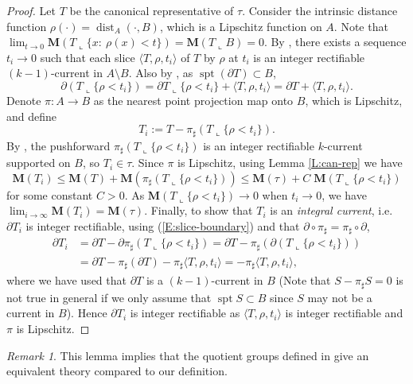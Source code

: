 \documentclass[10pt]{amsart}
\theoremstyle{definition}
\theoremstyle{remark}
\newtheorem{remark}[theorem]{Remark}
\numberwithin{equation}{section}
\newcommand{\lan}{\langle}
\newcommand{\ran}{\rangle}
\newcommand{\lc}{\llcorner}
\newcommand{\M}{\mathbf{M}}
\newcommand{\spt}{\operatorname{spt}}
\newcommand{\dist}{\operatorname{dist}}
\begin{document}
\begin{proof}
Let $T$ be the canonical representative of $\tau$. Consider the intrinsic distance function $\rho(\cdot) =\dist_A(\cdot, B)$, which is a Lipschitz function on $A$. Note that $\lim_{t\rightarrow 0}\M(T\lc \{x:\ \rho(x)< t\})=\M(T\lc B)=0$. By \cite[28.4]{Simon}, there exists a sequence $t_i \to 0$ such that each slice $\lan T, \rho, t_i \ran$ of $T$ by $\rho$ at $t_i$ is an integer rectifiable $(k-1)$-current in $A \setminus B$. Also by \cite[28.5(2)]{Simon}, as $\spt(\partial T) \subset B$,
\begin{equation}
\label{E:slice-boundary} 
\partial(T\lc\{\rho<t_i\})=\partial T\lc \{\rho<t_i\}+ \lan T, \rho, t_i \ran=\partial T+\lan T, \rho, t_i \ran.
\end{equation}
Denote $\pi:A \to B$ as the nearest point projection map onto $B$, which is Lipschitz, and define
\[ T_i:=T-{\pi}_{\sharp}(T\lc \{\rho<t_i\}).\]
By \cite[4.1.30]{Federer}, the pushforward ${\pi}_{\sharp}(T\lc \{\rho<t_i\})$ is an integer rectifiable $k$-current supported on $B$, so $T_i \in \tau$. Since $\pi$ is Lipschitz, using Lemma \ref{L:can-rep} we have
\[ \M(T_i)\leq \M(T)+\M({\pi}_{\sharp}(T\lc \{\rho<t_i\}))\leq \M(\tau)+C\; \M(T\lc\{\rho<t_i\})\]
for some constant $C>0$. As $\M(T\lc\{\rho<t_i\}) \to 0$ when $t_i \to 0$, we have $\lim_{i \to \infty} \M(T_i)=\M(\tau)$. Finally, to show that $T_i$ is an \emph{integral current}, i.e. $\partial T_i$ is integer rectifiable, using (\ref{E:slice-boundary}) and that $\partial \circ \pi_\sharp = \pi_\sharp \circ \partial$,
\begin{displaymath}
\begin{split}
\partial T_i & = \partial T-\partial {\pi}_{\sharp}(T\lc \{\rho<t_i\})=\partial T-{\pi}_{\sharp}(\partial(T\lc \{\rho<t_i\}))\\
                    & = \partial T-{\pi}_{\sharp}(\partial T)-{\pi}_{\sharp} \lan T, \rho, t_i \ran =-{\pi}_{\sharp} \lan T, \rho, t_i \ran,
\end{split}
\end{displaymath}
where we have used that $\partial T$ is a $(k-1)$-current in $B$ (Note that $S-{\pi}_{\sharp} S=0$ is not true in general if we only assume that $\spt S \subset B$ since $S$ may not be a current in $B$). Hence $\partial T_i$ is integer rectifiable as $\lan T, \rho, t_i \ran$ is integer rectifiable and $\pi$ is Lipschitz.
\end{proof}

\begin{remark}
This lemma implies that the quotient groups defined in \cite[(1.20)]{Almgren62} give an equivalent theory compared to our definition.
\end{remark}
\end{document}
